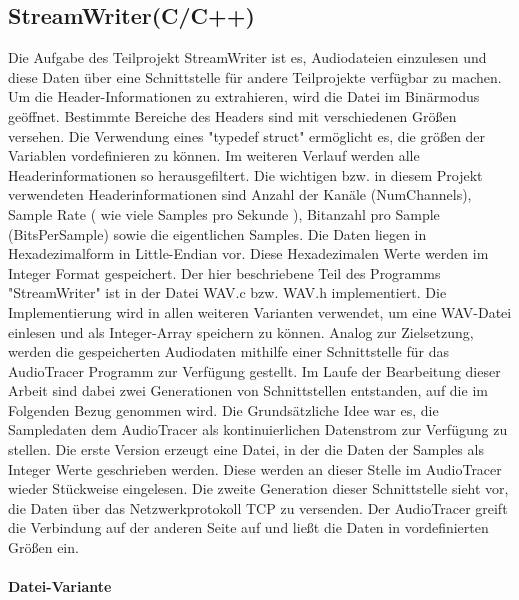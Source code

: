\subsection{StreamWriter(C/C++)}

Die Aufgabe des Teilprojekt StreamWriter ist es, Audiodateien einzulesen und diese Daten über eine Schnittstelle für andere Teilprojekte verfügbar zu machen.
Um die Header-Informationen zu extrahieren, wird die Datei im Binärmodus geöffnet. Bestimmte Bereiche des Headers sind mit verschiedenen Größen versehen. 
Die Verwendung eines "typedef struct" ermöglicht es, die größen der Variablen vordefinieren zu können. 
Im weiteren Verlauf werden alle Headerinformationen so herausgefiltert.
Die wichtigen bzw. in diesem Projekt verwendeten Headerinformationen sind Anzahl der Kanäle (NumChannels), Sample Rate ( wie viele Samples pro Sekunde ), Bitanzahl pro Sample (BitsPerSample) sowie die eigentlichen Samples.
Die Daten liegen in Hexadezimalform in Little-Endian vor. Diese Hexadezimalen Werte werden im Integer Format gespeichert. 
Der hier beschriebene Teil des Programms "StreamWriter" ist in der Datei WAV.c bzw. WAV.h implementiert. 
Die Implementierung wird in allen weiteren Varianten verwendet, um eine WAV-Datei einlesen und als Integer-Array speichern zu können.
Analog zur Zielsetzung, werden die gespeicherten Audiodaten mithilfe einer Schnittstelle für das AudioTracer Programm zur Verfügung gestellt.
Im Laufe der Bearbeitung dieser Arbeit sind dabei zwei Generationen von Schnittstellen entstanden, auf die im Folgenden Bezug genommen wird.
Die Grundsätzliche Idee war es, die Sampledaten dem AudioTracer als kontinuierlichen Datenstrom zur Verfügung zu stellen. 
Die erste Version erzeugt eine Datei, in der die Daten der Samples als Integer Werte geschrieben werden. Diese werden an dieser Stelle im AudioTracer wieder Stückweise eingelesen.
Die zweite Generation dieser Schnittstelle sieht vor, die Daten über das Netzwerkprotokoll TCP zu versenden. Der AudioTracer greift die Verbindung auf der anderen Seite auf und ließt die Daten in vordefinierten Größen ein.

\paragraph{Datei-Variante}

